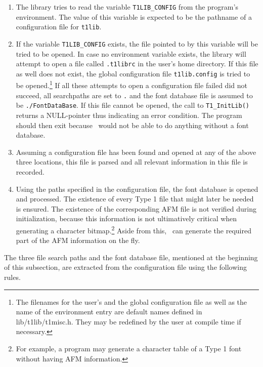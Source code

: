 \begin{enumerate}
\item The library tries to read the variable \verb+T1LIB_CONFIG+ from
  the program's environment.
  The value of this variable is expected to be the
  pathname of a configuration file for \verb+t1lib+. 
\item If the variable \verb+T1LIB_CONFIG+ exists, the file pointed to
  by this variable will be tried to be opened. In case no environment
  variable exists, the library will attempt to open a file called
  \verb+.t1librc+ in the user's home directory.
  If this file as well does
  not exist, the global configuration file \verb+t1lib.config+ is tried to be
  opened.\footnote{The filenames for the user's and the global configuration
    file as well as the name of the environment entry are default names 
    defined in {\ttfamily lib/t1lib/t1misc.h}. They may be redefined by the
    user at compile time if necessary.}
  If all these attempts to open a configuration file failed did not
  succeed, 
  all searchpaths are set to \verb+.+ and the font database
  file is assumed to be \verb+./FontDataBase+. If this file cannot be
  opened, the call to \verb+T1_InitLib()+ returns a NULL-pointer thus
  indicating an error condition. The program should then exit because
  \tonelib\ would not be able to do anything without a font database.
\item Assuming a configuration file has been found and opened at any of the
  above three locations, this file
  is parsed and all relevant information in this file is recorded.
\item Using the paths specified in the configuration file, the
  font database is opened and processed. The existence of every Type 1
  file that might later be needed is ensured. The existence of the
  corresponding AFM file is not verified during
  initialization, because this information is not ultimatively
  critical when generating a character bitmap.\footnote{For example, a
    program may generate a character table of a Type 1 font without
    having AFM information.} Aside from this, \tonelib\ can generate the
  required part of the AFM information on the fly.
\end{enumerate}
The three file search paths and the font database file, mentioned at the
beginning of this subsection, are extracted from the configuration
file using the following rules.
